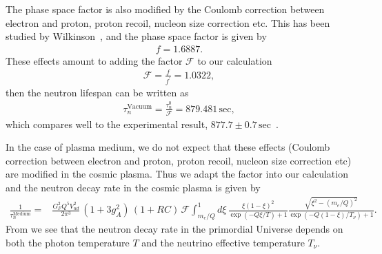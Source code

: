 The phase space factor is also modified by the Coulomb correction between electron and proton, proton recoil, nucleon size correction etc. This has been studied by Wilkinson~\cite{Wilkinson:1982hu}, and the phase space factor is given by~\cite{Czarnecki:2018okw,Czarnecki:2004cw,Wilkinson:1982hu}
\begin{align}
f=1.6887.
\end{align}
These effects amount to adding the factor $\mathcal{F}$ to our calculation
\begin{align}
\mathcal{F}=\frac{f}{f^\prime}=1.0322,
\end{align}
then the neutron lifespan can be written as 
\begin{align}
\tau^{\mathrm{Vacuum}}_n=\frac{\tau^0_n}{\mathcal{F}}=879.481\,\mathrm{sec},
\end{align}
which compares well to the experimental result, $877.7\pm0.7\,\mathrm{sec}$~\cite{Pattie:2017vsj}. 

In the case of plasma medium, we do not expect that these effects (Coulomb correction between electron and proton, proton recoil, nucleon size correction etc) are modified in the cosmic plasma. Thus we adapt the factor into our calculation and the neutron decay rate in the cosmic plasma is given by
\begin{align}
\label{Decay:Rate_02}
\frac{1}{\tau_n^{\mathrm{Medium}}}=&\frac{G^2_FQ^5V^2_{ud}}{2\pi^3}\,(1+3g^2_A)\,(1+RC)\,\mathcal{F}
\int^1_{m_e/Q}d\xi\,\frac{\xi(1-\xi)^2}{\exp\left(-Q\xi/{T}\right)+1}\frac{\sqrt{\xi^2-(m_e/Q)^2}}{\exp\left(-Q(1-\xi)/T_\nu\right)+1}.
\end{align}
From  we see that the neutron decay rate in the primordial Universe depends on both the photon temperature $T$ and the neutrino effective temperature $T_\nu$.

